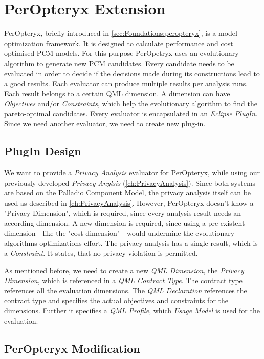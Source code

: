 \chapter{PerOpteryx Extension}
\label{ch:PerOpt}

PerOpteryx, briefly introduced in \autoref{sec:Foundations:peropteryx}, is a model optimization framework. It is designed to calculate performance and cost optimised PCM models. For this purpose PerOpetryx uses an evolutionary algorithm to generate new PCM candidates. Every candidate needs to be evaluated in order to decide if the decisions made during its constructions lead to a good results. Each evaluator can produce multiple results per analysis runs. Each result belongs to a certain QML dimension. A dimension can have \textit{Objectives} and/or \textit{Constraints}, which help the evolutionary algorithm to find the pareto-optimal candidates. Every evaluator is encapsulated in an \textit{Eclipse PlugIn}. Since we need another evaluator, we need to create new plug-in.

\section{PlugIn Design}
\label{sec:PerOpt:design}

We want to provide a \textit{Privacy Analysis} evaluator for PerOpteryx, while using our previously developed \textit{Privacy Anylsis} (\autoref{ch:PrivacyAnalysis}). Since both systems are based on the Palladio Component Model, the privacy analysis itself can be used as described in \autoref{ch:PrivacyAnalysis}. However, PerOpteryx doesn't know a "Privacy Dimension", which is required, since every analysis result needs an according dimension. A new dimension is required, since using a pre-existent dimension - like the "cost dimension" - would undermine the evolutionary algorithms optimizations effort. The privacy analysis has a single result, which is a \textit{Constraint}. It states, that no privacy violation is permitted.

As mentioned before, we need to create a new \textit{QML Dimension}, the \textit{Privacy Dimension}, which is referenced in a \textit{QML Contract Type}. The contract type references all the evaluation dimensions. The \textit{QML Declaration} references the contract type and specifies the actual objectives and constraints for the dimensions. Further it specifies a \textit{QML Profile}, which \textit{Usage Model} is used for the evaluation.


\section{PerOpteryx Modification}

